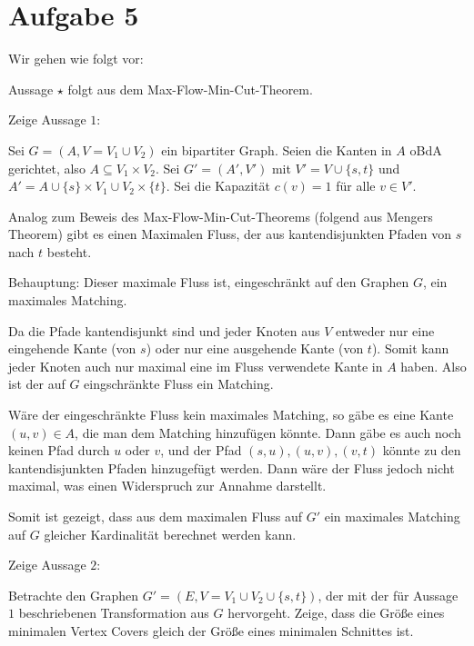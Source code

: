 \documentclass[a4paper]{article}
\begin{document}
\section{Aufgabe 5}

Wir gehen wie folgt vor:


Aussage $\star$ folgt aus dem Max-Flow-Min-Cut-Theorem.

Zeige Aussage $1$:

Sei $G = (A, V = V_1 \cup V_2)$ ein bipartiter Graph.
Seien die Kanten in $A$ oBdA gerichtet, also $A \subseteq V_1 \times V_2$.
Sei $G' = (A', V')$ mit $V' = V \cup
\{s, t\}$ und $A' = A \cup \{s\} \times V_1 \cup V_2 \times \{t\}$.
Sei die Kapazität $c(v) = 1$ für alle $v \in V'$.

Analog zum Beweis des Max-Flow-Min-Cut-Theorems (folgend aus Mengers
Theorem) gibt es einen Maximalen Fluss, der aus kantendisjunkten Pfaden von
$s$ nach $t$ besteht.

Behauptung: Dieser maximale Fluss ist, eingeschränkt auf den Graphen $G$, ein maximales Matching.

Da die Pfade kantendisjunkt sind und jeder Knoten aus $V$ entweder nur eine
eingehende Kante (von $s$) oder nur eine ausgehende Kante (von $t$). Somit
kann jeder Knoten auch nur maximal eine im Fluss verwendete Kante in $A$
haben. Also ist der auf $G$ eingschränkte Fluss ein Matching.

Wäre der eingeschränkte Fluss kein maximales Matching, so gäbe es eine Kante
$(u, v) \in A$, die man dem Matching hinzufügen könnte. Dann gäbe es auch
noch keinen Pfad durch $u$ oder $v$, und der Pfad $(s,u), (u,v), (v, t)$
könnte zu den kantendisjunkten Pfaden hinzugefügt werden. Dann wäre der
Fluss jedoch nicht maximal, was einen Widerspruch zur Annahme darstellt.

Somit ist gezeigt, dass aus dem maximalen Fluss auf $G'$ ein maximales
Matching auf $G$ gleicher Kardinalität berechnet werden kann.

Zeige Aussage $2$:

Betrachte den Graphen $G' = (E, V = V_1 \cup V_2 \cup \{s, t\})$, der mit
der für Aussage $1$ beschriebenen Transformation aus $G$ hervorgeht.
Zeige, dass die Größe eines minimalen Vertex Covers gleich der Größe eines
minimalen Schnittes ist.
\end{document}
